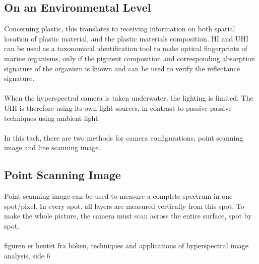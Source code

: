 \subsection{On an Environmental Level}
\noindent
Concerning plastic, this translates to receiving information on both spatial location of plastic material, and the plastic materials composition. 
%
%
\noindent
HI and UHI can be used as a taxonomical identification tool to make optical fingerprints of marine organisms, only if the pigment composition and corresponding absorption signature of the organism is known and can be used to verify the reflectance signature.
\\\\
\noindent
When the hyperspectral camera is taken underwater, the lighting is limited. The UHI is therefore using its own light sources, in contrast to passive passive techniques using ambient light.
\\\\
\noindent
In this task, there are two methods for camera configurations, point scanning image and line scanning image.
\subsection{Point Scanning Image}
Point scanning image can be used to measure a complete spectrum in one spot/pixel. In every spot, all layers are measured vertically from this spot. To make the whole picture, the camera must scan across the entire surface, spot by spot.
\\\\
figuren er hentet fra boken, techniques and applications of hyperspectral image analysis, side 6

